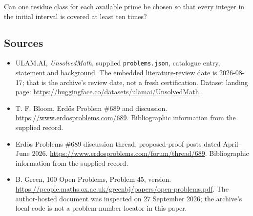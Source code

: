 \documentclass[11pt,a4paper]{article}
\begin{document}
Can one residue class for each available prime be chosen so that every integer in the initial interval is covered at least ten times?

\subsection{Sources}

{\small

\begin{itemize}

\item[\hypertarget{source:statement:1}{S1}] ULAM.AI, \emph{UnsolvedMath}, supplied \texttt{problems.json}, catalogue entry, statement and background. The embedded literature-review date is 2026-08-17; that is the archive’s review date, not a fresh certification. Dataset landing page: \url{https://huggingface.co/datasets/ulamai/UnsolvedMath}.

\item[\hypertarget{source:statement:2}{S2}] T. F. Bloom, Erdős Problem \#689 and discussion. \url{https://www.erdosproblems.com/689}. Bibliographic information from the supplied record.

\item[\hypertarget{source:statement:3}{S3}] Erdős Problems \#689 discussion thread, proposed-proof posts dated April--June 2026. \url{https://www.erdosproblems.com/forum/thread/689}. Bibliographic information from the supplied record.

\item[\hypertarget{source:statement:4}{S4}] B. Green, 100 Open Problems, Problem 45, version. \url{https://people.maths.ox.ac.uk/greenbj/papers/open-problems.pdf}. The author-hosted document was inspected on 27 September 2026; the archive’s local code is not a problem-number locator in this paper.

\end{itemize}

}

\label{end:statement}
\end{document}
